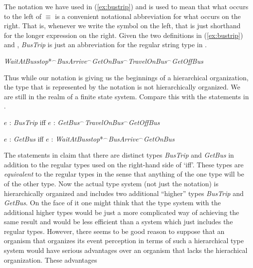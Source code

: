The notation we have used in (\ref{ex:bustrip}) and \preveg{} is used
to mean that what occurs to the left of $\equiv$ is a convenient
notational abbreviation for what occurs on the right.  That is,
whenever we write the symbol on the left, that is just shorthand for
the longer expression on the right.  Given the two definitions in
(\ref{ex:bustrip}) and \preveg{}, \textit{BusTrip} is just an
abbreviation for the regular string type in \nexteg{}.
\begin{ex} 
\textit{WaitAtBusstop}*$^{\frown}$\textit{BusArrive}$^{\frown}$\textit{GetOnBus}$^{\frown}$\textit{TravelOnBus}$^{\frown}$\textit{GetOffBus} 
\end{ex} 
Thus while our notation is giving us the beginnings of a hierarchical
organization, the type that is represented by the notation is not
hierarchically organized.  We are still in the realm of a finite state
system.
Compare this with the statements in \nexteg{}.
\begin{ex} 
\begin{subex} 
 
\item $e$ : \textit{BusTrip} iff $e$ : \textit{GetBus}$^{\frown}$\textit{TravelOnBus}$^{\frown}$\textit{GetOffBus} 
 
\item $e$ : \textit{GetBus} iff $e$ : \textit{WaitAtBusstop}*$^{\frown}$\textit{BusArrive}$^{\frown}$\textit{GetOnBus} 
 
\end{subex} 
   
\end{ex} 
The statements in \preveg{} claim that there are distinct types
\textit{BusTrip} and \textit{GetBus} in addition to the regular types
used on the right-hand side of `iff'.  These types are
\textit{equivalent} to the regular types in the sense that anything of
the one type will be of the other type.  Now the actual type system
(not just the notation) is
hierarchically organized and includes two additional ``higher''
types \textit{BusTrip} and \textit{GetBus}.  On the face of it one
might think that the type system with the additional higher types
would be just a more complicated way of achieving the same result and
would be less efficient than a system which just includes the regular
types.  However, there seems to be good reason to suppose that an
organism that organizes its event perception in terms of such a
hierarchical type system would have serious advantages over an
organism that lacks the hierachical organization.  These advantages
